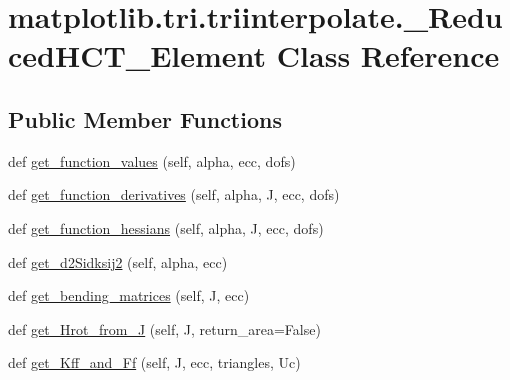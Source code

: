 \hypertarget{classmatplotlib_1_1tri_1_1triinterpolate_1_1__ReducedHCT__Element}{}\section{matplotlib.\+tri.\+triinterpolate.\+\_\+\+Reduced\+H\+C\+T\+\_\+\+Element Class Reference}
\label{classmatplotlib_1_1tri_1_1triinterpolate_1_1__ReducedHCT__Element}
\subsection*{Public Member Functions}
\begin{DoxyCompactItemize}
\item 
def \hyperlink{classmatplotlib_1_1tri_1_1triinterpolate_1_1__ReducedHCT__Element_ae02a0ad48004a518f336deb2968c2665}{get\+\_\+function\+\_\+values} (self, alpha, ecc, dofs)
\item 
def \hyperlink{classmatplotlib_1_1tri_1_1triinterpolate_1_1__ReducedHCT__Element_a8fcdb80b7f68008f5f0111efa0630c86}{get\+\_\+function\+\_\+derivatives} (self, alpha, J, ecc, dofs)
\item 
def \hyperlink{classmatplotlib_1_1tri_1_1triinterpolate_1_1__ReducedHCT__Element_a63ff9ad49e37549dcf349c97862d3a4b}{get\+\_\+function\+\_\+hessians} (self, alpha, J, ecc, dofs)
\item 
def \hyperlink{classmatplotlib_1_1tri_1_1triinterpolate_1_1__ReducedHCT__Element_a09c1c4848e269ea62d018b68aef58593}{get\+\_\+d2\+Sidksij2} (self, alpha, ecc)
\item 
def \hyperlink{classmatplotlib_1_1tri_1_1triinterpolate_1_1__ReducedHCT__Element_a0d08bd16a2f48a0989f0de1efc6c9079}{get\+\_\+bending\+\_\+matrices} (self, J, ecc)
\item 
def \hyperlink{classmatplotlib_1_1tri_1_1triinterpolate_1_1__ReducedHCT__Element_a55a70fad206d70afeed24b77ad30ab34}{get\+\_\+\+Hrot\+\_\+from\+\_\+J} (self, J, return\+\_\+area=False)
\item 
def \hyperlink{classmatplotlib_1_1tri_1_1triinterpolate_1_1__ReducedHCT__Element_a3b0e4db823a716604d1a9d0dc9b1bc06}{get\+\_\+\+Kff\+\_\+and\+\_\+\+Ff} (self, J, ecc, triangles, Uc)
\end{DoxyCompactItemize}
